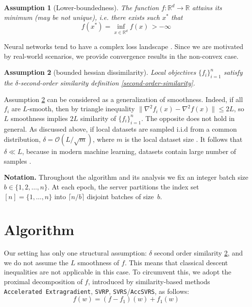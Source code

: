 \documentclass{article}
\newtheorem{assumption}{Assumption}
\begin{document}

\begin{assumption}[Lower-boundedness]
\label{ass:lower}
The function $f: \mathbb{R}^d \rightarrow \mathbb{R}$ attains its minimum (may be not unique), i.e. there exists such $x^*$ that  
    \[ f(x^*) = \inf_{x \in \mathbb{R}^d} f(x) \, > - \infty \]
\end{assumption}

Neural networks tend to have a complex loss landscape \citep{cybenko1989approximation, nguyen2018optimization}. Since we are motivated by real-world scenarios, we provide convergence results in the non-convex case. 

\begin{assumption}[bounded hessian dissimilarity]
\label{ass:similarity}
    Local objectives $\{f_i\}_{i=1}^n$ satisfy the $\delta$-second-order similarity definition \ref{second-order-similarity}.
\end{assumption}

Assumption \ref{ass:similarity} can be considered as a generalization of smoothness. Indeed, if all $f_i$ are $L$-smooth, then by triangle inequality $\|\nabla^2 f_i(x) - \nabla^2 f(x)\| \leq 2L$, so $L$ smoothness implies $2 L$ similarity of $\{f_i\}_{i=1}^n$. The opposite does not hold in general. As discussed above, if local datasets are sampled i.i.d from a common distribution, $\delta = \mathcal{O}(L/\sqrt{m})$, 
where $m$ is the local dataset size \cite{hendrikx2020statistically}. It follows that $\delta \ll L$, because in modern machine learning, datasets contain large number of samples \cite{kaplan2020scaling}. 

\textbf{Notation.} Throughout the algorithm and its analysis
we fix an integer batch size $b \in \{1, 2, \ldots, n\}$.
At each epoch, the server partitions the index set
$[n] = \{1, \ldots, n\}$ into $\lceil n/b \rceil$ disjoint batches
of size~$b$.

\section{Algorithm} \label{algorithm}

Our setting has only one structural assumption: $\delta$ second order similarity \ref{ass:similarity}, and we do not assume the $L$ smoothness of $f$. This means that classical descent inequalities are not applicable in this case. To circumvent this, we adopt the proximal decomposition of $f$, introduced by similarity-based methods \texttt{Accelerated Extragradient}, \texttt{SVRP}, \texttt{SVRS}/\texttt{AccSVRS}, as follows: 
\[
     f(w) = (f - f_1)(w) + f_1(w)
\]
\end{document}
